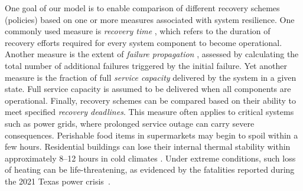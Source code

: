 \documentclass[conference]{IEEEtran}
\begin{document}
One goal of our model is to enable comparison of different recovery schemes (policies) based on one or more measures associated with system resilience. One commonly used measure is \emph{recovery time} \cite{biswas_repair_2025}, which refers to the duration of recovery efforts required for every system component to become operational. Another measure is the extent of \emph{failure propagation} \cite{wang_q-learning-based_2025}, assessed by calculating the total number of additional failures triggered by the initial failure. Yet another measure is the fraction of full \emph{service capacity} \cite{alobaidi_survivability_2016,yan_dynamic_2021,sarkale_solving_2018} delivered by the system in a given state. Full service capacity is assumed to be delivered when all components are operational. Finally, recovery schemes can be compared based on their ability to meet specified \emph{recovery deadlines}. This measure often applies to critical systems such as power grids, where prolonged service outage can carry severe consequences. Perishable food items in supermarkets may begin to spoil within a few hours. Residential buildings can lose their internal thermal stability within approximately 8–12 hours in cold climates \cite{noauthor_how_nodate}. Under extreme conditions, such loss of heating can be life-threatening, as evidenced by the fatalities reported during the 2021 Texas power crisis~\cite{svitek_texas_2022}.



%
\end{document}
